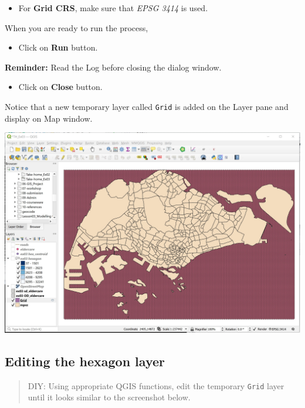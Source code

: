 \documentclass[
  letterpaper,
  DIV=11,
  numbers=noendperiod]{scrreprt}
\providecommand{\tightlist}{%
  \setlength{\itemsep}{0pt}\setlength{\parskip}{0pt}}\usepackage{longtable,booktabs,array}
\begin{document}
\begin{itemize}
\tightlist
\item
  For \textbf{Grid CRS}, make sure that \emph{EPSG 3414} is used.
\end{itemize}

When you are ready to run the process,

\begin{itemize}
\tightlist
\item
  Click on \textbf{Run} button.
\end{itemize}

\textbf{Reminder:} Read the Log before closing the dialog window.

\begin{itemize}
\tightlist
\item
  Click on \textbf{Close} button.
\end{itemize}

Notice that a new temporary layer called \texttt{Grid} is added on the
Layer pane and display on Map window.

\includegraphics{./img09/image3.jpg}

\hypertarget{editing-the-hexagon-layer}{%
\subsection{Editing the hexagon layer}\label{editing-the-hexagon-layer}}

\begin{quote}
DIY: Using appropriate QGIS functions, edit the temporary \texttt{Grid}
layer until it looks similar to the screenshot below.
\end{quote}
\end{document}
